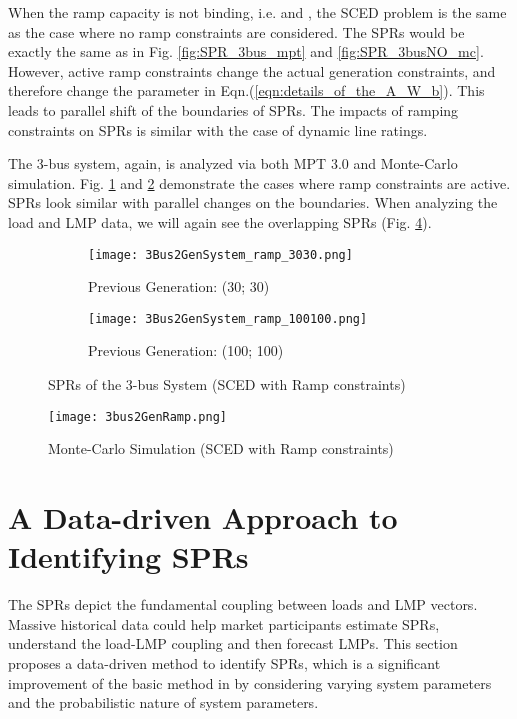 \documentclass[letterpaper, 11pt]{article}
\theoremstyle{plain}
\theoremstyle{definition}
\begin{document}
When the ramp capacity is not binding, i.e.  and , the SCED problem is the same as the case where no ramp constraints are considered. The SPRs would be exactly the same as in Fig. \ref{fig:SPR_3bus_mpt} and \ref{fig:SPR_3busNO_mc}.
However, active ramp constraints change the actual generation constraints, and therefore change the parameter  in Eqn.(\ref{eqn:details_of_the_A_W_b}). 
This leads to parallel shift of the boundaries of SPRs. The impacts of ramping constraints on SPRs is similar with the case of dynamic line ratings.


The 3-bus system, again, is analyzed via both MPT 3.0 and Monte-Carlo simulation. 
Fig. \ref{fig:ramp_3030} and \ref{fig:ramp_100100} demonstrate the cases where ramp constraints are active. SPRs look similar with parallel changes on the boundaries. 
When analyzing the load and LMP data, we will again see the overlapping SPRs (Fig. \ref{fig:spr_ramp_mc}). 


\begin{figure}[htbp]
  \centering
  \begin{subfigure}[t]{0.49\linewidth}
  \centering
  \texttt{[image: 3Bus2GenSystem\_ramp\_3030.png]}
  \caption{Previous Generation: (30; 30)}
  \label{fig:ramp_3030}
  \end{subfigure}
  \begin{subfigure}[t]{0.49\linewidth}
  \centering
  \texttt{[image: 3Bus2GenSystem\_ramp\_100100.png]}
  \caption{Previous Generation: (100; 100)}
 \label{fig:ramp_100100}
  \end{subfigure}  
  \caption{SPRs of the 3-bus System (SCED with Ramp constraints)}
  \label{fig:spr_ramp_mpt}
\end{figure}

\begin{figure}[htbp]
  \centering
  \texttt{[image: 3bus2GenRamp.png]}
  \caption{Monte-Carlo Simulation (SCED with Ramp constraints)}
  \label{fig:spr_ramp_mc}
\end{figure}








\section{A Data-driven Approach to Identifying SPRs} \label{sec:extended_data_driven_approach}
The SPRs depict the fundamental coupling between loads and LMP vectors. Massive historical data could help market participants estimate SPRs, understand the load-LMP coupling and then forecast LMPs. This section proposes a data-driven method to identify SPRs, which is a significant improvement of the basic method in \cite{Geng2015} by considering varying system parameters and the probabilistic nature of system parameters.
\end{document}
